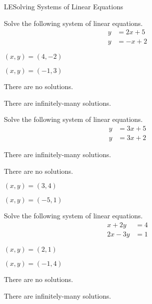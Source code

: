 \documentclass{article}
\begin{document}
\begin{module}{LE}{Solving Systems of Linear Equations}
\begin{readinessAssuranceTest}
\item Solve the following system of linear equations.
      \begin{align*}
      y   &=   2x+5 \\
      y  &=  -x+2
      \end{align*}

\begin{multicols}{4}
\begin{readinessAssuranceTestChoices}
\item \((x,y)=(4,-2)\)
\item \((x,y)=(-1,3)\) %
\item There are no solutions.
\item There are infinitely-many solutions.
\end{readinessAssuranceTestChoices}
\end{multicols}


\item Solve the following system of linear equations.
      \begin{align*}
      y   &=  3x+5 \\
      y  &=  3x+2
      \end{align*}

\begin{multicols}{4}
\begin{readinessAssuranceTestChoices}
\item There are infinitely-many solutions.
\item There are no solutions. %
\item
\((x,y)=(3,4)\)
\item
\((x,y)=(-5,1)\)
\end{readinessAssuranceTestChoices}
\end{multicols}


\item Solve the following system of linear equations.
      \begin{align*}
      x+2y   &=   4 \\
      2x-3y  &=  1
      \end{align*}

\begin{multicols}{4}
\begin{readinessAssuranceTestChoices}


\item
\((x,y)=(2,1)\) %
\item
\((x,y)=(-1,4)\)
\item There are no solutions.
\item There are infinitely-many solutions.
\end{readinessAssuranceTestChoices}
\end{multicols}



\end{readinessAssuranceTest}
\end{module}
\end{document}
